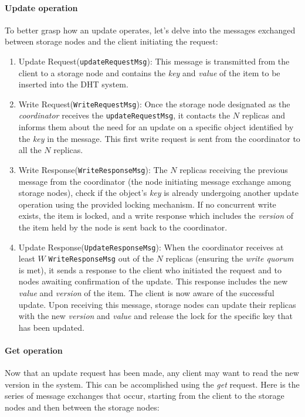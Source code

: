 \documentclass[a4paper, 11pt]{article}
\begin{document}
\paragraph{Update operation} To better grasp how an update operates, let's delve into the messages exchanged between storage nodes and the client initiating the request:

\begin{enumerate}
    \item Update Request(\verb|updateRequestMsg|): This message is transmitted from the client to a storage node and contains the \textit{key} and \textit{value} of the item to be inserted into the DHT system.

    \item Write Request(\verb|WriteRequestMsg|): Once the storage node designated as the \textit{coordinator} receives the \verb|updateRequestMsg|, it contacts the $N$ replicas and informs them about the need for an update on a specific object identified by the \textit{key} in the message. This first write request is sent from the coordinator to all the $N$ replicas.

    \item Write Response(\verb|WriteResponseMsg|): The $N$ replicas receiving the previous message from the coordinator (the node initiating message exchange among storage nodes), check if the object's \textit{key} is already undergoing another update operation using the provided locking mechanism. If no concurrent write exists, the item is locked, and a write response which includes the \textit{version} of the item held by the node is sent back to the coordinator.

    \item Update Response(\verb|UpdateResponseMsg|): When the coordinator receives at least $W$ \verb|WriteResponseMsg| out of the $N$ replicas (ensuring the \textit{write quorum} is met), it sends a response to the client who initiated the request and to nodes awaiting confirmation of the update. This response includes the new \textit{value} and \textit{version} of the item. The client is now aware of the successful update. Upon receiving this message, storage nodes can update their replicas with the new \textit{version} and \textit{value} and release the lock for the specific key that has been updated.
\end{enumerate}

\paragraph{Get operation} Now that an update request has been made, any client may want to read the new version in the system. This can be accomplished using the \textit{get} request. Here is the series of message exchanges that occur, starting from the client to the storage nodes and then between the storage nodes:
\end{document}
